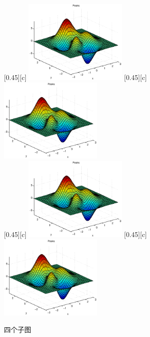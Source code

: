 \documentclass{article}
\begin{document}
    \begin{figure}[!htbp]
        \centering
        [0.45\textwidth][c]{
            \centering
            \includegraphics[width=0.45\textwidth]{example}
            \label{}
        }%
        \hspace*{0.1cm}
        [0.45\textwidth][c]{
            \centering
            \includegraphics[width=0.45\textwidth]{example}
            \label{}
        }\\%
        [0.45\textwidth][c]{
            \centering
            \includegraphics[width=0.45\textwidth]{example}
            \label{}
        }%
        \hspace*{0.1cm}
        [0.45\textwidth][c]{
            \centering
            \includegraphics[width=0.45\textwidth]{example}
            \label{}
        }%
        \caption{四个子图}
        \label{}
    \end{figure}
\end{document}
